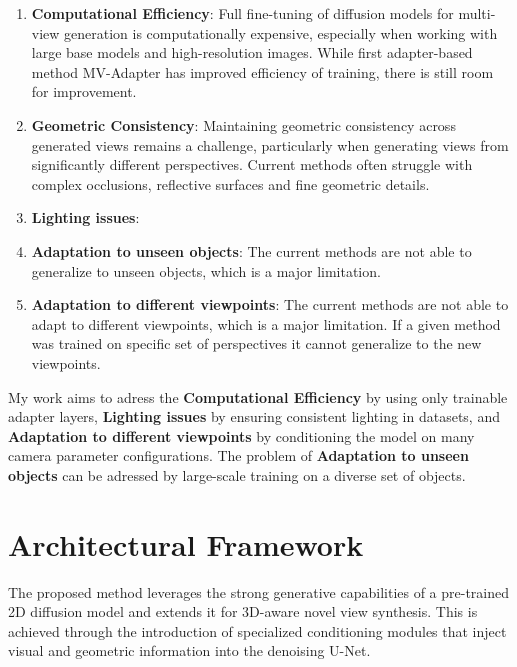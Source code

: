 \begin{enumerate}
  \item \textbf{Computational Efficiency}: Full fine-tuning of diffusion models for multi-view generation is computationally expensive, especially when working with large base models and high-resolution images. While first adapter-based method MV-Adapter has improved efficiency of training, there is still room for improvement.

  \item \textbf{Geometric Consistency}: Maintaining geometric consistency across generated views remains a challenge, particularly when generating views from significantly different perspectives. Current methods often struggle with complex occlusions, reflective surfaces and fine geometric details.

  \item \textbf{Lighting issues}:

  \item \textbf{Adaptation to unseen objects}: The current methods are not able to generalize to unseen objects, which is a major limitation.

  \item \textbf{Adaptation to different viewpoints}: The current methods are not able to adapt to different viewpoints, which is a major limitation. If a given method was trained on specific set of perspectives it cannot generalize to the new viewpoints.
\end{enumerate}

My work aims to adress the \textbf{Computational Efficiency} by using only trainable adapter layers, \textbf{Lighting issues} by ensuring consistent lighting in datasets, and \textbf{Adaptation to different viewpoints} by conditioning the model on many camera parameter configurations.
The problem of \textbf{Adaptation to unseen objects} can be adressed by large-scale training on a diverse set of objects.

\section{Architectural Framework}\label{sec:architectural-framework}
The proposed method leverages the strong generative capabilities of a pre-trained 2D diffusion model and extends it for 3D-aware novel view synthesis. This is achieved through the introduction of specialized conditioning modules that inject visual and geometric information into the denoising U-Net.


